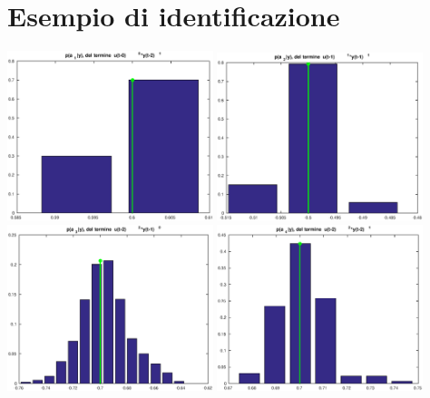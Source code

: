 \documentclass[10pt,a4paper]{article}
\author{Nella Barcelli}
\begin{document}
\section{Esempio di identificazione}
\includegraphics[width=0.45\textwidth]{ak_1.eps} \includegraphics[width=0.45\textwidth]{ak_2.eps}\\
\includegraphics[width=0.45\textwidth]{ak_3.eps} \includegraphics[width=0.45\textwidth]{ak_4.eps}  
\end{document}
